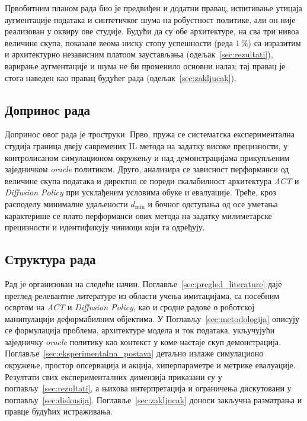 \documentclass[12pt, a4paper]{article}
\begin{document}
Првобитним планом рада био је предвиђен и додатни правац, испитивање утицаја аугментације података и синтетичког шума на робустност политике, али он није реализован у оквиру ове студије.
Будући да су обе архитектуре, на сва три нивоа величине скупа, показале веома ниску стопу успешности (реда $1\,\%$) са изразитим и архитектурно независним платоом заустављања (одељак~\ref{sec:rezultati}), варирање аугментације и шума не би променило основни налаз; тај правац је стога наведен као правац будућег рада (одељак~\ref{sec:zakljucak}).

\subsection{Допринос рада}
\label{subsec:doprinos}
Допринос овог рада је троструки.
Прво, пружа се систематска експериментална студија граница двеју савремених IL метода на задатку високе прецизности, у контролисаном симулационом окружењу и над демонстрацијама прикупљеним заједничком \textit{oracle} политиком.
Друго, анализира се зависност перформанси од величине скупа података и директно се пореди скалабилност архитектура \textit{ACT} и \textit{Diffusion Policy} при усклађеним условима обуке и евалуације.
Треће, кроз расподелу минималне удаљености $d_{\min}$ и бочног одступања од осе уметања карактерише се плато перформанси ових метода на задатку милиметарске прецизности и идентификују чиниоци који га одређују.

\subsection{Структура рада}
\label{subsec:struktura}
Рад је организован на следећи начин.
Поглавље~\ref{sec:pregled_literature} даје преглед релевантне литературе из области учења имитацијама, са посебним освртом на \textit{ACT} и \textit{Diffusion Policy}, као и сродне радове о роботској манипулацији деформабилним објектима.
У Поглављу~\ref{sec:metodologija} описују се формулација проблема, архитектуре модела и ток података, укључујући заједничку \textit{oracle} политику као контекст у коме настаје скуп демонстрација.
Поглавље~\ref{sec:eksperimentalna_postava} детаљно излаже симулационо окружење, простор опсервација и акција, хиперпараметре и метрике евалуације.
Резултати свих експерименталних димензија приказани су у поглављу~\ref{sec:rezultati}, а њихова интерпретација и ограничења дискутовани у поглављу~\ref{sec:diskusija}.
Поглавље~\ref{sec:zakljucak} доноси закључна разматрања и правце будућих истраживања.
\end{document}
